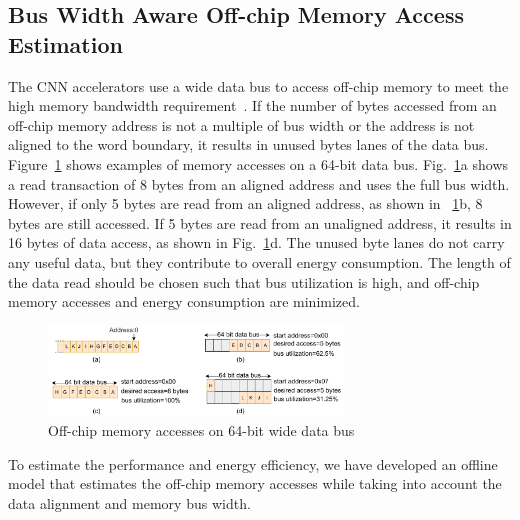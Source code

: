 \documentclass[a4paper,10pt]{article}
\begin{document}
\subsection{Bus Width Aware Off-chip Memory Access Estimation}\label{sec:OffChipAccessModel}
The CNN accelerators use a wide data bus to access off-chip memory to meet the high memory bandwidth requirement~\cite{Chen2016EyerissAS,chen2014diannao}. If the number of bytes accessed from an off-chip memory address is not a multiple of bus width or the address is not aligned to the word boundary, it results in unused bytes lanes of the data bus. Figure~\ref{fig:AXI_AccesseOn64BitDataBus} shows examples of memory accesses on a 64-bit data bus.  Fig.~\ref{fig:AXI_AccesseOn64BitDataBus}a shows a read transaction of 8 bytes from an aligned address and uses the full bus width. However, if only 5 bytes are read from an aligned address, as shown in \figurename~\ref{fig:AXI_AccesseOn64BitDataBus}b, 8 bytes are still accessed. If 5 bytes are read from an unaligned address, it results in 16 bytes of data access, as shown in Fig.~\ref{fig:AXI_AccesseOn64BitDataBus}d. The unused byte lanes do not carry any useful data, but they contribute to overall energy consumption. The length of the data read should be chosen such that bus utilization is high, and off-chip memory accesses and energy consumption are minimized.
\begin{figure}[!htb]
	\centering
	\includegraphics[width=0.7\textwidth]{./images/BurstTranscationOnAXI}
	\caption{Off-chip memory accesses on 64-bit wide data bus}
	\label{fig:AXI_AccesseOn64BitDataBus}
\end{figure}
To estimate the performance and energy efficiency, we have developed an offline model that estimates the off-chip memory accesses while taking into account the data alignment and memory bus width.
\end{document}
